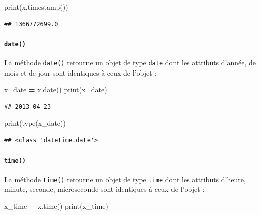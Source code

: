 \documentclass[
  12pt,
]{book}
\newenvironment{Shaded}{\begin{snugshade}}{\end{snugshade}}
\newcommand{\BuiltInTok}[1]{#1}
\newcommand{\NormalTok}[1]{#1}
\newcommand{\OperatorTok}[1]{\textcolor[rgb]{0.81,0.36,0.00}{\textbf{#1}}}
\numberwithin{equation}{section}
\numberwithin{countremarque}{section}
\begin{document}
\begin{Shaded}
\begin{Highlighting}[]
\BuiltInTok{print}\NormalTok{(x.timestamp())}
\end{Highlighting}
\end{Shaded}

\begin{lstlisting}
## 1366772699.0
\end{lstlisting}

\paragraph{\texorpdfstring{\texttt{date()}}{date()}}\label{date}

La méthode \texttt{date()} retourne un objet de type \texttt{date} dont les attributs d'année, de mois et de jour sont identiques à ceux de l'objet :

\begin{Shaded}
\begin{Highlighting}[]
\NormalTok{x\_date }\OperatorTok{=}\NormalTok{ x.date()}
\BuiltInTok{print}\NormalTok{(x\_date)}
\end{Highlighting}
\end{Shaded}

\begin{lstlisting}
## 2013-04-23
\end{lstlisting}

\begin{Shaded}
\begin{Highlighting}[]
\BuiltInTok{print}\NormalTok{(}\BuiltInTok{type}\NormalTok{(x\_date))}
\end{Highlighting}
\end{Shaded}

\begin{lstlisting}
## <class 'datetime.date'>
\end{lstlisting}

\paragraph{\texorpdfstring{\texttt{time()}}{time()}}\label{time}

La méthode \texttt{time()} retourne un objet de type \texttt{time} dont les attributs d'heure, minute, seconde, microseconde sont identiques à ceux de l'objet :

\begin{Shaded}
\begin{Highlighting}[]
\NormalTok{x\_time }\OperatorTok{=}\NormalTok{ x.time()}
\BuiltInTok{print}\NormalTok{(x\_time)}
\end{Highlighting}
\end{Shaded}
\end{document}

